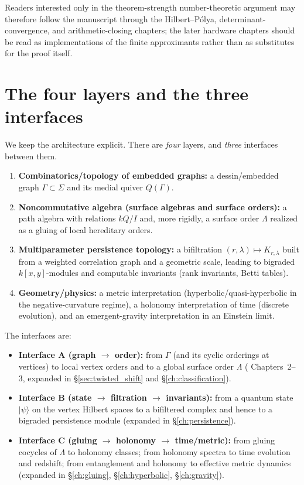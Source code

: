 \documentclass[11pt,oneside]{amsbook}
\numberwithin{equation}{section}
\theoremstyle{plain}
\theoremstyle{definition}
\theoremstyle{remark}
\begin{document}
Readers interested only in the theorem-strength number-theoretic argument may therefore follow the manuscript through the Hilbert--Pólya, determinant-convergence, and arithmetic-closing chapters; the later hardware chapters should be read as implementations of the finite approximants rather than as substitutes for the proof itself.

\section*{The four layers and the three interfaces}

We keep the architecture explicit.
There are \emph{four} layers, and \emph{three} interfaces between them.

\begin{enumerate}
\item \textbf{Combinatorics/topology of embedded graphs:}
a dessin/embedded graph $\Gamma\subset \Sigma$ and its medial quiver $Q(\Gamma)$.
\item \textbf{Noncommutative algebra (surface algebras and surface orders):}
a path algebra with relations $kQ/I$ and, more rigidly, a surface order $\Lambda$ realized as a gluing of local hereditary orders.
\item \textbf{Multiparameter persistence topology:}
a bifiltration $(r,\lambda)\mapsto K_{r,\lambda}$ built from a weighted correlation graph and a geometric scale,
leading to bigraded $k[x,y]$-modules and computable invariants (rank invariants, Betti tables).
\item \textbf{Geometry/physics:}
a metric interpretation (hyperbolic/quasi-hyperbolic in the negative-curvature regime),
a holonomy interpretation of time (discrete evolution),
and an emergent-gravity interpretation in an Einstein limit.
\end{enumerate}

The interfaces are:
\begin{itemize}
\item \textbf{Interface A (graph $\to$ order):} from $\Gamma$ (and its cyclic orderings at vertices) to local vertex orders and to a global surface order $\Lambda$ ( Chapters~2--3, expanded in \S\ref{sec:twisted_shift} and \S\ref{ch:classification}).
\item \textbf{Interface B (state $\to$ filtration $\to$ invariants):} from a quantum state $|\psi\rangle$ on the vertex Hilbert spaces to a bifiltered complex and hence to a bigraded persistence module (expanded in \S\ref{ch:persistence}).
\item \textbf{Interface C (gluing $\to$ holonomy $\to$ time/metric):} from gluing cocycles of $\Lambda$ to holonomy classes; from holonomy spectra to time evolution and redshift; from entanglement and holonomy to effective metric dynamics (expanded in \S\ref{ch:gluing}, \S\ref{ch:hyperbolic}, \S\ref{ch:gravity}).
\end{itemize}
\end{document}
